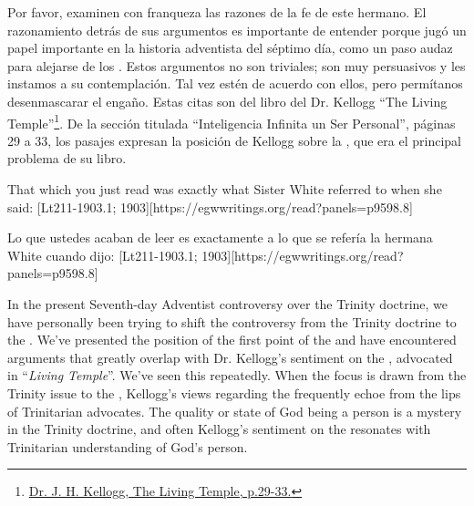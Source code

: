 Por favor, examinen con franqueza las razones de la fe de este hermano. El razonamiento detrás de sus argumentos es importante de entender porque jugó un papel importante en la historia adventista del séptimo día, como un paso audaz para alejarse de los . Estos argumentos no son triviales; son muy persuasivos y les instamos a su contemplación. Tal vez estén de acuerdo con ellos, pero permítanos desenmascarar el engaño. Estas citas son del libro del Dr. Kellogg “The Living Temple”\footnote{\href{https://archive.org/details/J.H.Kellogg.TheLivingTemple1903}{Dr. J. H. Kellogg, The Living Temple, p.29-33.}}. De la sección titulada “Inteligencia Infinita un Ser Personal”, páginas 29 a 33, los pasajes expresan la posición de Kellogg sobre la , que era el principal problema de su libro.


That which you just read was exactly what Sister White referred to when she said: [Lt211-1903.1; 1903][https://egwwritings.org/read?panels=p9598.8]


Lo que ustedes acaban de leer es exactamente a lo que se refería la hermana White cuando dijo: [Lt211-1903.1; 1903][https://egwwritings.org/read?panels=p9598.8]


In the present Seventh-day Adventist controversy over the Trinity doctrine, we have personally been trying to shift the controversy from the Trinity doctrine to the . We’ve presented the position of the first point of the  and have encountered arguments that greatly overlap with Dr. Kellogg’s sentiment on the , advocated in “\textit{Living Temple}”. We’ve seen this repeatedly. When the focus is drawn from the Trinity issue to the , Kellogg’s views regarding the  frequently echoe from the lips of Trinitarian advocates. The quality or state of God being a person is a mystery in the Trinity doctrine, and often Kellogg’s sentiment on the  resonates with Trinitarian understanding of God’s person.


